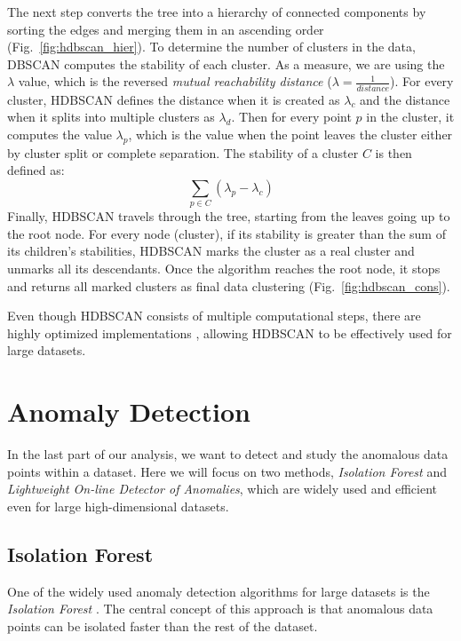 The next step converts the tree into a hierarchy of connected components by sorting the edges and merging them in an ascending order (Fig.~\ref{fig:hdbscan_hier}). To determine the number of clusters in the data, DBSCAN computes the stability of each cluster. As a measure, we are using the $\lambda$ value, which is the reversed \textit{mutual reachability distance} ($\lambda = \frac{1}{distance}$). For every cluster, HDBSCAN defines the distance when it is created as $\lambda_c$ and the distance when it splits into multiple clusters as $\lambda_d$. Then for every point $p$ in the cluster, it computes the value $\lambda_p$, which is the value when the point leaves the cluster either by cluster split or complete separation. The stability of a cluster $C$ is then defined as:
\begin{equation}
    \sum_{p \in C}(\lambda_p - \lambda_c)
\end{equation}
Finally, HDBSCAN travels through the tree, starting from the leaves going up to the root node. For every node (cluster), if its stability is greater than the sum of its children's stabilities, HDBSCAN marks the cluster as a real cluster and unmarks all its descendants. Once the algorithm reaches the root node, it stops and returns all marked clusters as final data clustering (Fig.~\ref{fig:hdbscan_cons}).

Even though HDBSCAN consists of multiple computational steps, there are highly optimized implementations \cite{vis:hdbscan-imp}, allowing HDBSCAN to be effectively used for large datasets.

\section{Anomaly Detection}
In the last part of our analysis, we want to detect and study the anomalous data points within a dataset. Here we will focus on two methods, \textit{Isolation Forest} and \textit{Lightweight On-line Detector of Anomalies}, which are widely used and efficient even for large high-dimensional datasets.

\subsection{Isolation Forest}
One of the widely used anomaly detection algorithms for large datasets is the \textit{Isolation Forest} \cite{vis:isoforest}. The central concept of this approach is that anomalous data points can be isolated faster than the rest of the dataset. 

